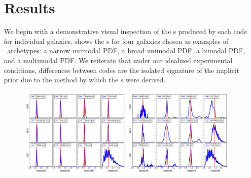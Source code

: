 \section{Results}

We begin with a demonstrative visual inspection of the \pzpdf s produced by each code for individual galaxies.
 shows the \pzpdf s for four galaxies chosen as examples of \pzpdf\ archetypes: a narrow unimodal PDF, a broad unimodal PDF, a bimodal PDF, and a multimodal PDF.
We reiterate that under our idealized experimental conditions, differences between codes are the isolated signature of the implicit prior due to the method by which the \pzpdf s were derived.

\begin{figure}
	\includegraphics[width=0.49\textwidth]{figures/pzdc1/pz_12codes_261931_noseaborn_crop.jpg}\includegraphics[width=0.49\textwidth]{figures/pzdc1/pz_12codes_471167_noseaborn_crop.jpg}\\

\end{figure}
